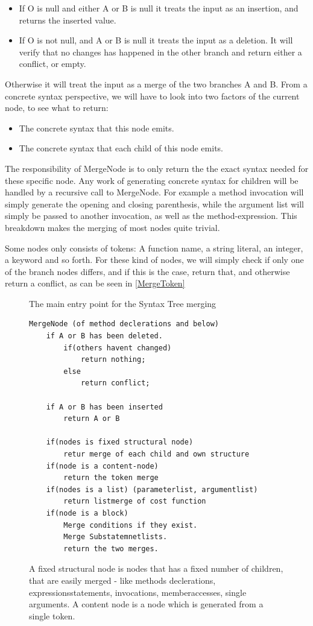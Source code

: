 \documentclass[11pt]{article}
\begin{document}
\begin{itemize}
   \item If O is null and either A or B is null it treats the input as an insertion, and returns the inserted value.
   \item If O is not null, and A or B is null it treats the input as a deletion. It will verify that no changes has happened in the other branch and return either a conflict, or empty.
\end{itemize}

Otherwise it will treat the input as a merge of the two branches A and B. From a concrete syntax perspective, we will have to look into two factors of the current node, to see what to return:

\begin{itemize}
   \item The concrete syntax that this node emits.
   \item The concrete syntax that each child of this node emits.
\end{itemize}

The responsibility of MergeNode is to only return the the exact syntax needed for these specific node. Any work of generating concrete syntax for children will be handled by a recursive call to MergeNode. For example a method invocation will simply generate the opening and closing parenthesis, while the argument list will simply be passed to another invocation, as well as the method-expression. This breakdown makes the merging of most nodes quite trivial.

Some nodes only consists of tokens: A function name, a string literal, an integer, a keyword and so forth. For these kind of nodes, we will simply check if only one of the branch nodes differs, and if this is the case, return that, and otherwise return a conflict, as can be seen in \ref{MergeToken}


\begin{figure}
  \caption{The main entry point for the Syntax Tree merging}
  \label{MergeNode}
\begin{verbatim}
MergeNode (of method declerations and below)
    if A or B has been deleted.
        if(others havent changed)
            return nothing;
        else
            return conflict;
            
    if A or B has been inserted
        return A or B
        
    if(nodes is fixed structural node)
        retur merge of each child and own structure
    if(node is a content-node) 
        return the token merge
    if(nodes is a list) (parameterlist, argumentlist)
        return listmerge of cost function
    if(node is a block)
        Merge conditions if they exist.
        Merge Substatemnetlists.
        return the two merges.

\end{verbatim}
\caption{A fixed structural node is nodes that has a fixed number of children, that are easily merged - like methods declerations, expressionsstatements, invocations, memberaccesses, single arguments. A content node is a node which is generated from a single token.}
\end{figure}
\end{document}
